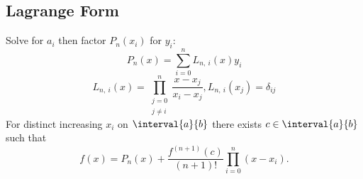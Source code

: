 \documentclass{article}
\begin{document}
\begin{multicols}{3}
    \subsection{Lagrange Form}
    Solve for \(a_i\) then factor \(P_n\left( x_i \right)\) for \(y_i\):
    \begin{equation*}
        P_n\left( x \right) = \sum_{i = 0}^n L_{n,\: i}\left( x \right) y_i
    \end{equation*}
    \begin{equation*}
        L_{n,\: i}\left( x \right) = \prod_{\substack{j = 0 \\ j \neq i}}^n \frac{x - x_j}{x_i - x_j}, L_{n,\: i}\left( x_j \right) = \delta_{ij}
    \end{equation*}
    For distinct increasing \(x_i\) on \(\interval{a}{b}\) there exists \(c \in \interval{a}{b}\) such that
    \begin{equation*}
        f\left( x \right) = P_n\left( x \right) + \frac{f^{\left( n + 1 \right)} \left( c \right)}{\left( n + 1 \right)!} \prod_{i = 0}^n \left( x - x_i \right).
    \end{equation*}

\end{multicols}
\end{document}
